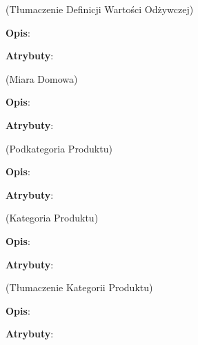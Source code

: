 \begin{enumerate}[label={\textbf{KAT/\protect\threedigits{\theenumi}}}, wide, labelwidth=!, labelindent=0pt, labelsep=0pt, series=reqs]
     \label{kat:NutritionDefinitionTranslation} (Tłumaczenie Definicji Wartości Odżywczej)

    \textbf{Opis}: \lipsum[1]
    \par
    \textbf{Atrybuty}:
    \begin{itemize}[series=atr, wide, align=left, leftmargin=5cm]
         \label{kat:NutritionDefinitionTranslation:id}
         \label{kat:NutritionDefinitionTranslation:translation}
         \label{kat:NutritionDefinitionTranslation:language}
    \end{itemize}

     \label{kat:HouseholdMeasure} (Miara Domowa)

    \textbf{Opis}: \lipsum[1]
    \par
    \textbf{Atrybuty}:
    \begin{itemize}[series=atr, wide, align=left, leftmargin=5cm]
         \label{kat:HouseholdMeasure:id}
         \label{kat:HouseholdMeasure:description}
         \label{kat:HouseholdMeasure:gramsWeight}
         \label{kat:HouseholdMeasure:isVisible}
    \end{itemize}

     \label{kat:ProductSubcategory} (Podkategoria Produktu)

    \textbf{Opis}: \lipsum[1]
    \par
    \textbf{Atrybuty}:
    \begin{itemize}[series=atr, wide, align=left, leftmargin=5cm]
         \label{kat:ProductSubcategory:id}
         \label{kat:ProductSubcategory:description}
    \end{itemize}

     \label{kat:ProductCategory} (Kategoria Produktu)

    \textbf{Opis}: \lipsum[1]
    \par
    \textbf{Atrybuty}:
    \begin{itemize}[series=atr, wide, align=left, leftmargin=5cm]
         \label{kat:ProductCategory:id}
         \label{kat:ProductCategory:description}
    \end{itemize}

     \label{kat:ProductCategoryTranslation} (Tłumaczenie Kategorii Produktu)

    \textbf{Opis}: \lipsum[1]
    \par
    \textbf{Atrybuty}:
    \begin{itemize}[series=atr, wide, align=left, leftmargin=5cm]
         \label{kat:ProductCategoryTranslation:id}
         \label{kat:ProductCategoryTranslation:translation}
         \label{kat:ProductCategoryTranslation:language}
    \end{itemize}


\end{enumerate}
